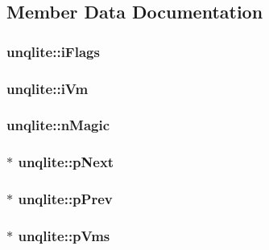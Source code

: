 \subsection{Member Data Documentation}
\hypertarget{structunqlite_a72c4bc974bb5d4c1271dc231cae4269e}{
\subsubsection[{i\-Flags}]{ unqlite\-::i\-Flags}}\label{d6/d0c/structunqlite_a72c4bc974bb5d4c1271dc231cae4269e}
\hypertarget{structunqlite_a61dd67f9b7db767b39b48ee6e6fec303}{
\subsubsection[{i\-Vm}]{ unqlite\-::i\-Vm}}\label{d6/d0c/structunqlite_a61dd67f9b7db767b39b48ee6e6fec303}
\hypertarget{structunqlite_ae0f2f069bbe3f4056375f0d9ef15084e}{
\subsubsection[{n\-Magic}]{ unqlite\-::n\-Magic}}\label{d6/d0c/structunqlite_ae0f2f069bbe3f4056375f0d9ef15084e}
\hypertarget{structunqlite_af2af5cb2ac50b1b6cc62aee179775dce}{
\subsubsection[{p\-Next}]{$\ast$ unqlite\-::p\-Next}}\label{d6/d0c/structunqlite_af2af5cb2ac50b1b6cc62aee179775dce}
\hypertarget{structunqlite_a074417d2b7bef440b8c25e4c9f267464}{
\subsubsection[{p\-Prev}]{ $\ast$ unqlite\-::p\-Prev}}\label{d6/d0c/structunqlite_a074417d2b7bef440b8c25e4c9f267464}
\hypertarget{structunqlite_a5a854d6e7998deadc1d814074be94eca}{
\subsubsection[{p\-Vms}]{$\ast$ unqlite\-::p\-Vms}}\label{d6/d0c/structunqlite_a5a854d6e7998deadc1d814074be94eca}
